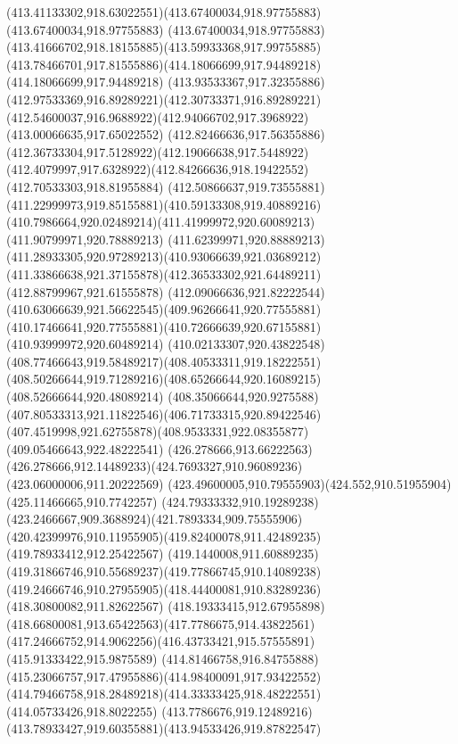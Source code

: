 {{{{				\curveto(413.41133302,918.63022551)(413.67400034,918.97755883)(413.67400034,918.97755883)
				\curveto(413.67400034,918.97755883)(413.41666702,918.18155885)(413.59933368,917.99755885)
				\curveto(413.78466701,917.81555886)(414.18066699,917.94489218)(414.18066699,917.94489218)
				\curveto(413.93533367,917.32355886)(412.97533369,916.89289221)(412.30733371,916.89289221)
				\curveto(412.54600037,916.9688922)(412.94066702,917.3968922)(413.00066635,917.65022552)
				\curveto(412.82466636,917.56355886)(412.36733304,917.5128922)(412.19066638,917.5448922)
				\curveto(412.4079997,917.6328922)(412.84266636,918.19422552)(412.70533303,918.81955884)
				\curveto(412.50866637,919.73555881)(411.22999973,919.85155881)(410.59133308,919.40889216)
				\curveto(410.7986664,920.02489214)(411.41999972,920.60089213)(411.90799971,920.78889213)
				\curveto(411.62399971,920.88889213)(411.28933305,920.97289213)(410.93066639,921.03689212)
				\curveto(411.33866638,921.37155878)(412.36533302,921.64489211)(412.88799967,921.61555878)
				\curveto(412.09066636,921.82222544)(410.63066639,921.56622545)(409.96266641,920.77555881)
				\curveto(410.17466641,920.77555881)(410.72666639,920.67155881)(410.93999972,920.60489214)
				\curveto(410.02133307,920.43822548)(408.77466643,919.58489217)(408.40533311,919.18222551)
				\curveto(408.50266644,919.71289216)(408.65266644,920.16089215)(408.52666644,920.48089214)
				\curveto(408.35066644,920.9275588)(407.80533313,921.11822546)(406.71733315,920.89422546)
				\curveto(407.4519998,921.62755878)(408.9533331,922.08355877)(409.05466643,922.48222541)
				\moveto(426.278666,913.66222563)
				\curveto(426.278666,912.14489233)(424.7693327,910.96089236)(423.06000006,911.20222569)
				\curveto(423.49600005,910.79555903)(424.552,910.51955904)(425.11466665,910.7742257)
				\curveto(424.79333332,910.19289238)(423.2466667,909.3688924)(421.7893334,909.75555906)
				\curveto(420.42399976,910.11955905)(419.82400078,911.42489235)(419.78933412,912.25422567)
				\curveto(419.1440008,911.60889235)(419.31866746,910.55689237)(419.77866745,910.14089238)
				\curveto(419.24666746,910.27955905)(418.44400081,910.83289236)(418.30800082,911.82622567)
				\curveto(418.19333415,912.67955898)(418.66800081,913.65422563)(417.7786675,914.43822561)
				\curveto(417.24666752,914.9062256)(416.43733421,915.57555891)(415.91333422,915.9875589)
				\curveto(414.81466758,916.84755888)(415.23066757,917.47955886)(414.98400091,917.93422552)
				\curveto(414.79466758,918.28489218)(414.33333425,918.48222551)(414.05733426,918.8022255)
				\curveto(413.7786676,919.12489216)(413.78933427,919.60355881)(413.94533426,919.87822547)
}}}}
